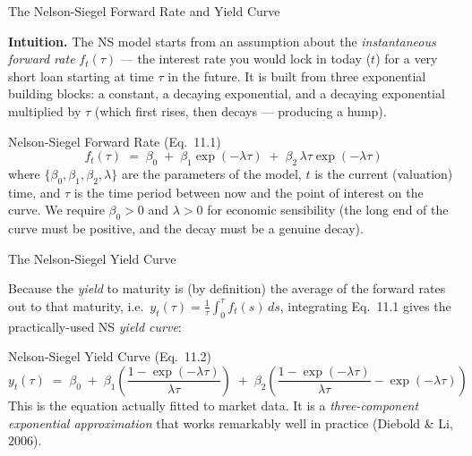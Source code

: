 \documentclass[aspectratio=169,10pt]{beamer}
\begin{document}
\begin{frame}{The Nelson-Siegel Forward Rate and Yield Curve}

\textbf{Intuition.} The NS model starts from an assumption about the
\emph{instantaneous forward rate} $f_t(\tau)$ --- the interest rate you would
lock in today ($t$) for a very short loan starting at time $\tau$ in the
future. It is built from three exponential building blocks: a constant, a
decaying exponential, and a decaying exponential multiplied by $\tau$ (which
first rises, then decays --- producing a hump).

\begin{block}{Nelson-Siegel Forward Rate (Eq.\ 11.1)}
  \[
    f_t(\tau) \;=\; \beta_0 \;+\; \beta_1 \exp(-\lambda \tau) \;+\; \beta_2\,\lambda\tau \exp(-\lambda \tau)
  \]
  where $\{\beta_0, \beta_1, \beta_2, \lambda\}$ are the parameters of the
  model, $t$ is the current (valuation) time, and $\tau$ is the time period
  between now and the point of interest on the curve. We require
  $\beta_0 > 0$ and $\lambda > 0$ for economic sensibility (the long end of
  the curve must be positive, and the decay must be a genuine decay).
\end{block}

\end{frame}

\begin{frame}{The Nelson-Siegel Yield Curve}

Because the \emph{yield} to maturity is (by definition) the average of the
forward rates out to that maturity, i.e.\ $y_t(\tau) = \frac{1}{\tau}\int_0^\tau f_t(s)\,ds$,
integrating Eq.\ 11.1 gives the practically-used NS \emph{yield curve}:

\begin{block}{Nelson-Siegel Yield Curve (Eq.\ 11.2)}
  \[
    y_t(\tau) \;=\; \beta_0 \;+\; \beta_1 \left(\frac{1-\exp(-\lambda\tau)}{\lambda\tau}\right)
    \;+\; \beta_2\left(\frac{1-\exp(-\lambda\tau)}{\lambda\tau} - \exp(-\lambda\tau)\right)
  \]
  This is the equation actually fitted to market data. It is a
  \emph{three-component exponential approximation} that works remarkably
  well in practice (Diebold \& Li, 2006).
\end{block}

\end{frame}
\end{document}
